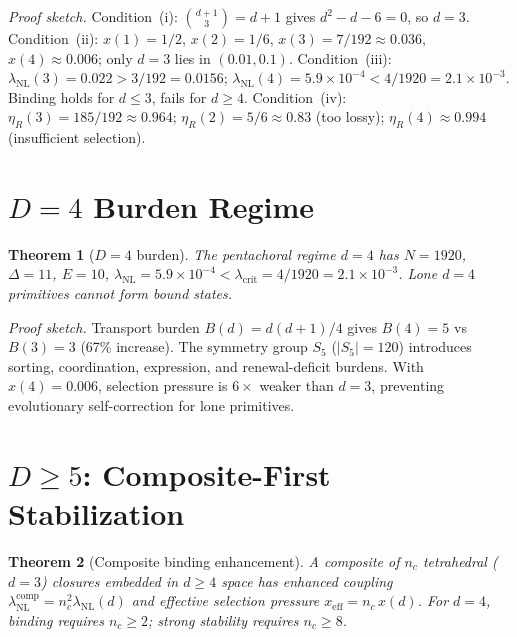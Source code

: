 \documentclass[11pt,twocolumn]{article}
\newtheorem{theorem}{Theorem}
\begin{document}
\textit{Proof sketch.}
Condition~(i): $\binom{d+1}{3}=d+1$ gives $d^2-d-6=0$, so $d=3$.
Condition~(ii): $x(1)=1/2$, $x(2)=1/6$, $x(3)=7/192\approx 0.036$, $x(4)\approx 0.006$; only $d=3$ lies in $(0.01,0.1)$.
Condition~(iii): $\lambda_{\mathrm{NL}}(3)=0.022>3/192=0.0156$; $\lambda_{\mathrm{NL}}(4)=5.9\times 10^{-4}<4/1920=2.1\times 10^{-3}$. Binding holds for $d\leq 3$, fails for $d\geq 4$.
Condition~(iv): $\eta_R(3)=185/192\approx 0.964$; $\eta_R(2)=5/6\approx 0.83$ (too lossy); $\eta_R(4)\approx 0.994$ (insufficient selection).

\section{$D=4$ Burden Regime}
\label{sec:d4}

\begin{theorem}[$D=4$ burden]
\label{thm:d4}
The pentachoral regime $d=4$ has $N=1920$, $\Delta=11$, $E=10$, $\lambda_{\mathrm{NL}}=5.9\times 10^{-4}<\lambda_{\mathrm{crit}}=4/1920=2.1\times 10^{-3}$.
Lone $d=4$ primitives cannot form bound states.
\end{theorem}

\textit{Proof sketch.}
Transport burden $B(d)=d(d{+}1)/4$ gives $B(4)=5$ vs $B(3)=3$ (67\% increase).
The symmetry group $S_5$ ($|S_5|=120$) introduces sorting, coordination, expression, and renewal-deficit burdens.
With $x(4)=0.006$, selection pressure is $6\times$ weaker than $d=3$, preventing evolutionary self-correction for lone primitives.

\section{$D\geq 5$: Composite-First Stabilization}
\label{sec:d5}

\begin{theorem}[Composite binding enhancement]
\label{thm:composite}
A composite of $n_c$ tetrahedral ($d=3$) closures embedded in $d\geq 4$ space has enhanced coupling $\lambda_{\mathrm{NL}}^{\mathrm{comp}}=n_c^2\lambda_{\mathrm{NL}}(d)$ and effective selection pressure $x_{\mathrm{eff}}=n_c\,x(d)$.
For $d=4$, binding requires $n_c\geq 2$; strong stability requires $n_c\geq 8$.
\end{theorem}
\end{document}

